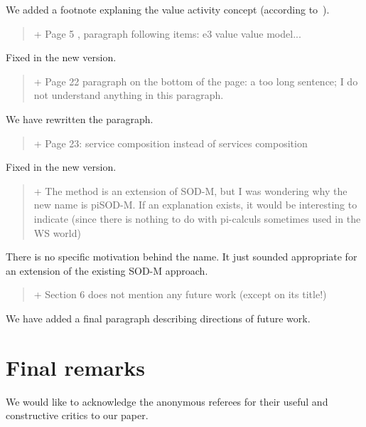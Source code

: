 \documentclass[12pt,a4wide]{article}
\begin{document}
\noindent 
We added a footnote explaning the value activity concept (according to~\cite{Gordijn02valuebased}).

\begin{quotation}\sf\footnotesize

+ Page 5 , paragraph following items: e3 value value model... 
\end{quotation}

\noindent 
Fixed in the new version.

\begin{quotation}\sf\footnotesize

+ Page 22 paragraph on the bottom of the page: a too long sentence; I do not understand anything in this paragraph. 
\end{quotation}

\noindent 
We have rewritten the paragraph.

\begin{quotation}\sf\footnotesize

+ Page 23: service composition instead of services composition 
\end{quotation}

\noindent 
Fixed in the new version.


\begin{quotation}\sf\footnotesize

+ The method is an extension of SOD-M, but I was wondering why the new name is piSOD-M. If an explanation exists, it would be interesting to indicate (since there is nothing to do with pi-calculs sometimes used in the WS world) 
\end{quotation}

\noindent 
There is no specific motivation behind the name. 
It just sounded appropriate for an extension of the existing SOD-M approach.

\begin{quotation}\sf\footnotesize

+ Section 6 does not mention any future work (except on its title!) 

\end{quotation}

\noindent 
We have added a final paragraph describing directions of future work.



\section*{Final remarks}

We would like to acknowledge the anonymous referees for their useful and constructive critics to our paper.


  
\end{document}
